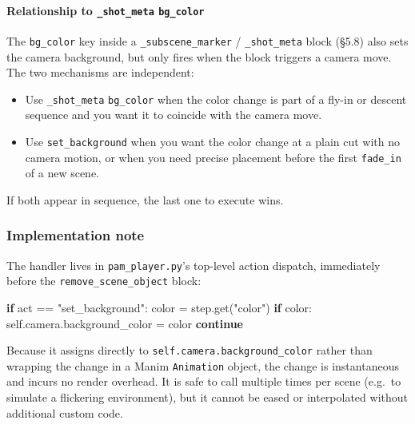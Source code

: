 \documentclass[
  11pt,
]{book}
\newenvironment{Shaded}{}{}
\newcommand{\BuiltInTok}[1]{\textcolor[rgb]{0.00,0.50,0.00}{#1}}
\newcommand{\ControlFlowTok}[1]{\textcolor[rgb]{0.00,0.44,0.13}{\textbf{#1}}}
\newcommand{\NormalTok}[1]{#1}
\newcommand{\OperatorTok}[1]{\textcolor[rgb]{0.40,0.40,0.40}{#1}}
\newcommand{\StringTok}[1]{\textcolor[rgb]{0.25,0.44,0.63}{#1}}
\providecommand{\tightlist}{%
  \setlength{\itemsep}{0pt}\setlength{\parskip}{0pt}}
\begin{document}
\paragraph{Relationship to \texttt{\_shot\_meta}
\texttt{bg\_color}}\label{set-background-vs-shot-meta}

The \texttt{bg\_color} key inside a \texttt{\_subscene\_marker} /
\texttt{\_shot\_meta} block (§5.8) also sets the camera background,
but only fires when the block triggers a camera move. The two
mechanisms are independent:

\begin{itemize}
\tightlist
\item
  Use \texttt{\_shot\_meta} \texttt{bg\_color} when the color change
  is part of a fly-in or descent sequence and you want it to coincide
  with the camera move.
\item
  Use \texttt{set\_background} when you want the color change at a
  plain cut with no camera motion, or when you need precise placement
  before the first \texttt{fade\_in} of a new scene.
\end{itemize}

If both appear in sequence, the last one to execute wins.

\subsubsection{Implementation
note}\label{set-background-implementation}

The handler lives in \texttt{pam\_player.py}'s top-level action
dispatch, immediately before the \texttt{remove\_scene\_object} block:

\begin{Shaded}
\begin{Highlighting}[]
\ControlFlowTok{if} \BuiltInTok{act} \OperatorTok{==} \StringTok{"set\_background"}\NormalTok{:}
    \NormalTok{color }\OperatorTok{=} \NormalTok{step.get(}\StringTok{"color"}\NormalTok{)}
    \ControlFlowTok{if} \NormalTok{color:}
        \NormalTok{self.camera.background\_color }\OperatorTok{=} \NormalTok{color}
    \ControlFlowTok{continue}
\end{Highlighting}
\end{Shaded}

Because it assigns directly to \texttt{self.camera.background\_color}
rather than wrapping the change in a Manim \texttt{Animation} object,
the change is instantaneous and incurs no render overhead. It is safe
to call multiple times per scene (e.g.\ to simulate a flickering
environment), but it cannot be eased or interpolated without additional
custom code.
\end{document}
